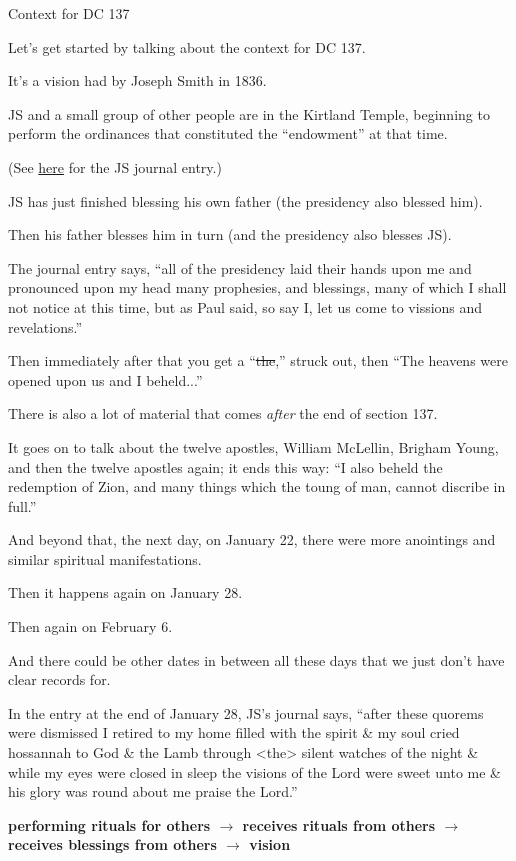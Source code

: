 \begin{compactitem}
			\item Context for DC 137
				\begin{compactitem}
					\item Let's get started by talking about the context for DC 137. 
					\item It's a vision had by Joseph Smith in 1836. 
					\item JS and a small group of other people are in the Kirtland Temple, beginning to perform the ordinances that constituted the ``endowment'' at that time. 
					\item (See \hyperlink{EMS-1836-JS-21-JAN-1836-h}{here} for the JS journal entry.)
					\item JS has just finished blessing his own father (the presidency also blessed him).
					\item Then his father blesses him in turn (and the presidency also blesses JS).
					\item The journal entry says, ``all of the presidency laid their hands upon me and pronounced upon my head many prophesies, and blessings, many of which I shall not notice at this time, but as Paul said, so say I, let us come to vissions and revelations.''
					\item Then immediately after that you get a ``\sout{the},'' struck out, then ``The heavens were opened upon us and I beheld...''
					\item There is also a lot of material that comes \textit{after} the end of section 137.
					\item It goes on to talk about the twelve apostles, William McLellin, Brigham Young, and then the twelve apostles again; it ends this way: ``I also beheld the redemption of Zion, and many things which the toung of man, cannot discribe in full.''
					\item And beyond that, the next day, on January 22, there were more anointings and similar spiritual manifestations.
					\item Then it happens again on January 28.
					\item Then again on February 6.
					\item And there could be other dates in between all these days that we just don't have clear records for.
					\item In the entry at the end of January 28, JS's journal says, ``after these quorems were dismissed I retired to my home filled with the spirit \& my soul cried hossannah to God \& the Lamb through <the> silent watches of the night \& while my eyes were closed in sleep the visions of the Lord were sweet unto me \& his glory was round about me praise the Lord.''
					\item {}
						\begin{compactitem}
							\item \textbf{performing rituals for others $\rightarrow$ receives rituals from others $\rightarrow$ receives blessings from others $\rightarrow$ vision}
						\end{compactitem}
				\end{compactitem}
				

\end{compactitem}
